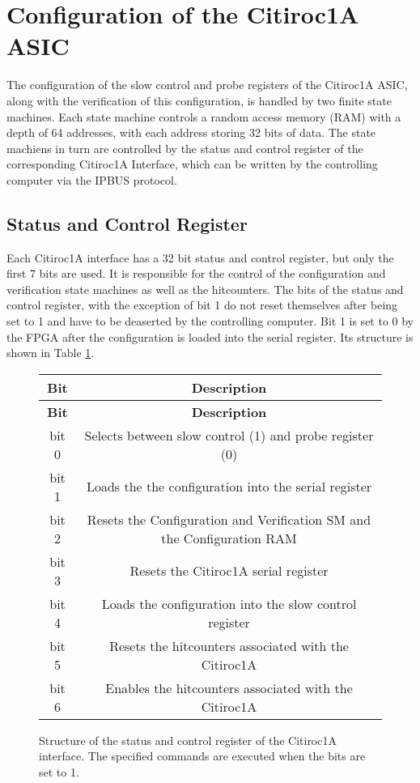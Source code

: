 \section{Configuration of the Citiroc1A ASIC}

The configuration of the slow control and probe registers of the Citiroc1A ASIC,
along with the verification of this configuration, is handled by two finite state machines.
\newline
Each state machine controls a random access memory (RAM) with a depth of 64 addresses,
with each address storing 32 bits of data.
\newline
The state machiens in turn are controlled by the status and control register of the corresponding Citiroc1A Interface, which can be written by the controlling computer via the IPBUS protocol.
\subsection{Status and Control Register}
Each Citiroc1A interface has a 32 bit status and control register, but only the first 7 bits are used.
It is responsible for the control of the configuration and verification state machines as well as the hitcounters.
The bits of the status and control register, with the exception of bit 1
do not reset themselves after being set to 1 and have to be deaserted by the controlling computer.
\newline
Bit 1 is set to 0 by the FPGA after the configuration is loaded into the serial register.
\newline
Its structure is shown in Table \ref{tab:status_control_register}.
\begin{figure}[H]
    \centering
\begin{longtable}{|c|c|}
    \hline
    \textbf{Bit} & \textbf{Description} \\
    \hline
    \endfirsthead
    
    \hline
    \textbf{Bit} & \textbf{Description} \\
    \hline
    \endhead
    
    \hline
    \endfoot
    
    \hline
    \endlastfoot
    bit 0 & Selects between slow control (1) and probe register (0) \\
    bit 1 & Loads the the configuration into the serial register\\
    bit 2 & Resets the Configuration and Verification SM and the Configuration RAM \\
    bit 3 & Resets the  Citiroc1A serial register \\
    bit 4 & Loads the configuration into the slow control register \\
    bit 5 & Resets the hitcounters associated with the Citiroc1A \\
    bit 6 & Enables the hitcounters associated with the Citiroc1A \\
    \hline
    \end{longtable}
    \caption{Structure of the status and control register of the Citiroc1A interface. 
    The specified commands are executed when the bits are set to 1. }  
    \label{tab:status_control_register}
\end{figure}  
  
